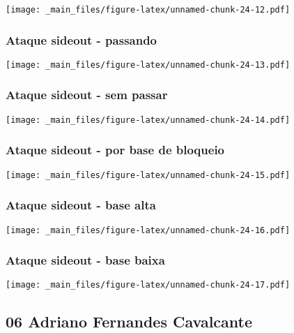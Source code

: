 \documentclass[
]{book}
\begin{document}
\texttt{[image: \_main\_files/figure-latex/unnamed-chunk-24-12.pdf]}

\subsubsection*{Ataque sideout - passando}\label{ataque-sideout---passando}

\texttt{[image: \_main\_files/figure-latex/unnamed-chunk-24-13.pdf]}

\subsubsection*{Ataque sideout - sem passar}\label{ataque-sideout---sem-passar}

\texttt{[image: \_main\_files/figure-latex/unnamed-chunk-24-14.pdf]}

\subsubsection*{Ataque sideout - por base de bloqueio}\label{ataque-sideout---por-base-de-bloqueio}

\texttt{[image: \_main\_files/figure-latex/unnamed-chunk-24-15.pdf]}

\subsubsection*{Ataque sideout - base alta}\label{ataque-sideout---base-alta}

\texttt{[image: \_main\_files/figure-latex/unnamed-chunk-24-16.pdf]}

\subsubsection*{Ataque sideout - base baixa}\label{ataque-sideout---base-baixa}

\texttt{[image: \_main\_files/figure-latex/unnamed-chunk-24-17.pdf]} \newpage

\subsection{06 Adriano Fernandes Cavalcante}\label{adriano-fernandes-cavalcante}
\end{document}
